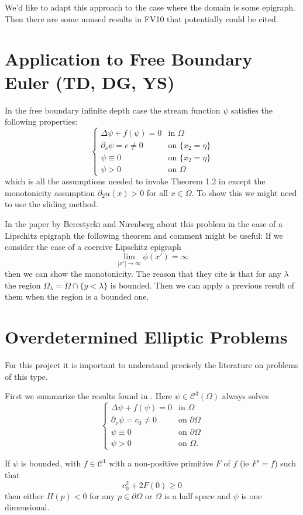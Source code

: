We'd like to adapt this approach to the case where the domain is some epigraph. Then there are some unused results in FV10 that potentially could be cited.

\section{Application to Free Boundary Euler (TD, DG, YS)}

In the free boundary infinite depth case the stream function $\psi$ satisfies the following properties:
\[\begin{cases} \Delta \psi + f(\psi) = 0 & \text{in $\Omega$} \\ 
\partial_\nu\psi = c \neq 0 & \text{on $\{x_2 = \eta\}$} \\ 
\psi \equiv 0 & \text{on $\{x_2 = \eta\}$} \\
\psi > 0 & \text{on $\Omega$}
\end{cases}\]
which is all the assumptions needed to invoke Theorem 1.2 in \cite{FV10} except the monotonicity assumption $\partial_2u(x) > 0$ for all $x \in \Omega$. To show this we might need to use the sliding method.

In the paper by Berestycki and Nirenberg about this problem in the case of a Lipschitz epigraph the following theorem and comment might be useful: If we consider the case of a coercive Lipschitz epigraph
\[\lim_{|x'| \to \infty}\phi(x') = \infty\]
then we can show the monotonicity. The reason that they cite is that for any $\lambda$ the region $\Omega_\lambda = \Omega \cap \{y < \lambda\}$ is bounded. Then we can apply a previous result of them when the region is a bounded one.

\section{Overdetermined Elliptic Problems}

For this project it is important to understand precisely the literature on problems of this type.

First we summarize the results found in \cite{RSW23}. Here $\psi \in \mathcal{C}^3(\Omega)$ always solves
\[\begin{cases} \Delta \psi + f(\psi) = 0 & \text{in $\Omega$} \\ 
\partial_\nu\psi = c_0 \neq 0 & \text{on $\partial \Omega$} \\ 
\psi \equiv 0 & \text{on $\partial \Omega$} \\
\psi > 0 & \text{on $\Omega$.}
\end{cases}\]
\begin{theorem}
    If $\psi$ is bounded, with $f \in \mathcal{C}^1$ with a non-positive primitive $F$ of $f$ (ie $F' = f$) such that 
    \[c_0^2 + 2F(0) \geq 0\]
    then either $H(p) < 0$ for any $p \in \partial \Omega$ or $\Omega$ is a half space and $\psi$ is one dimensional.
\end{theorem}

